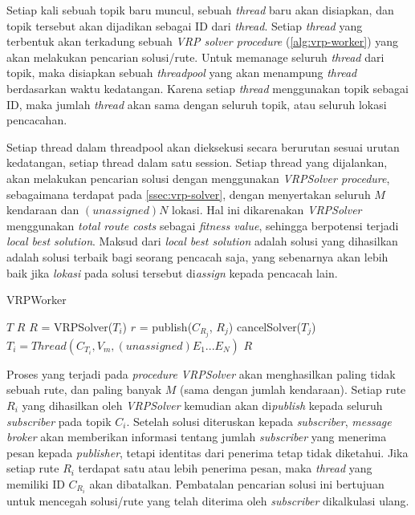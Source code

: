 Setiap kali sebuah topik baru muncul, sebuah \textit{thread} baru akan disiapkan, dan topik tersebut akan dijadikan sebagai ID dari \textit{thread}. Setiap \textit{thread} yang terbentuk akan terkadung sebuah \textit{VRP solver procedure} (\autoref{alg:vrp-worker}) yang akan melakukan pencarian solusi/rute. Untuk memanage seluruh \textit{thread} dari topik, maka disiapkan sebuah \textit{threadpool} yang akan menampung \textit{thread} berdasarkan waktu kedatangan. Karena setiap \textit{thread} menggunakan topik sebagai ID, maka jumlah \textit{thread} akan sama dengan seluruh topik, atau seluruh lokasi pencacahan.


Setiap thread dalam threadpool akan dieksekusi secara berurutan sesuai urutan kedatangan, setiap thread dalam satu session. Setiap thread yang dijalankan, akan melakukan pencarian solusi dengan menggunakan \textit{VRPSolver procedure}, sebagaimana terdapat pada \autoref{ssec:vrp-solver}, dengan menyertakan seluruh $M$ kendaraan dan $(unassigned) N$ lokasi. Hal ini dikarenakan \textit{VRPSolver} menggunakan \textit{total route costs} sebagai \textit{fitness value}, sehingga berpotensi terjadi \textit{local best solution}. Maksud dari \textit{local best solution} adalah solusi yang dihasilkan adalah solusi terbaik bagi seorang pencacah saja, yang sebenarnya akan lebih baik jika \textit{lokasi} pada solusi tersebut di\textit{assign} kepada pencacah lain.


\begin{algorithm}[!]
	\caption{VRPWorker}
	\label{alg:vrp-worker}
	\begin{algorithmic}[1]
		\renewcommand{\algorithmicrequire}{\textbf{Input:}}
		\renewcommand{\algorithmicensure}{\textbf{Output:}}
		\REQUIRE $T$
		\ENSURE  $R$
			\STATE $R$ = VRPSolver($T_i$)
				\STATE $r$ = publish($C_{R_j}$, $R_j$)
					\STATE cancelSolver($T_j$)
					\STATE $T_i = Thread(C_{T_i}, V_m, (unassigned) E_1...E_N)$
				\ENDIF
			\ENDFOR
		\ENDFOR
		\RETURN $R$
	\end{algorithmic}
\end{algorithm}


Proses yang terjadi pada \textit{procedure} \textit{VRPSolver} akan menghasilkan paling tidak sebuah rute, dan paling banyak $M$ (sama dengan jumlah kendaraan). Setiap rute $R_i$ yang dihasilkan oleh \textit{VRPSolver} kemudian akan di\textit{publish} kepada seluruh \textit{subscriber} pada topik $C_i$. Setelah solusi diteruskan kepada \textit{subscriber}, \textit{message broker} akan memberikan informasi tentang jumlah \textit{subscriber} yang menerima pesan kepada \textit{publisher}, tetapi identitas dari penerima tetap tidak diketahui. Jika setiap rute $R_i$ terdapat satu atau lebih penerima pesan, maka \textit{thread} yang memiliki ID $C_{R_i}$ akan dibatalkan. Pembatalan pencarian solusi ini bertujuan untuk mencegah solusi/rute yang telah diterima oleh \textit{subscriber} dikalkulasi ulang.


